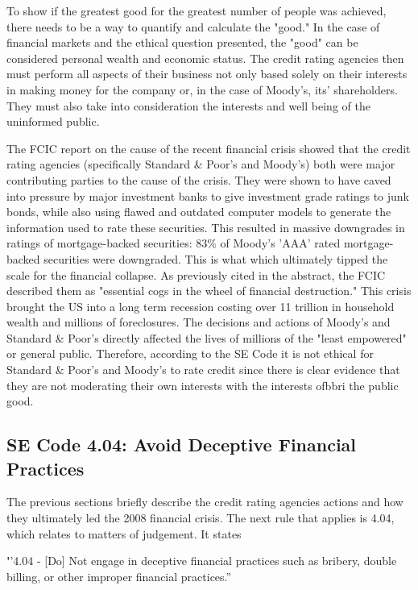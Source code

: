 \documentclass[11pt]{article}
\begin{document}
\begin{multicols}{2}
To show if the greatest good for the greatest number of people was achieved, there needs to be a way to quantify and calculate the "good." In the case of financial markets and the ethical question presented, the "good" can be considered personal wealth and economic status.  The credit rating agencies then must perform all aspects of their business not only based solely on their interests in making money for the company or, in the case of Moody's, its' shareholders.  They must also take into consideration the interests and well being of the uninformed public.

The FCIC report on the cause of the recent financial crisis showed that the credit rating agencies (specifically Standard \& Poor's and Moody's) both were major contributing parties to the cause of the crisis. \cite{govtReport, huffCreditCause}  They were shown to have caved into pressure by major investment banks to give investment grade ratings to junk bonds, while also using flawed and outdated computer models to generate the information used to rate these securities.  This resulted in massive downgrades in ratings of mortgage-backed securities: 83\% of Moody's 'AAA' rated mortgage-backed securities were downgraded. \cite[p.~xxv]{govtReport} This is what which ultimately tipped the scale for the financial collapse.  As previously cited in the abstract, the FCIC described them as "essential cogs in the wheel of financial destruction."  This crisis brought the US into a long term recession costing over 11 trillion in household wealth and millions of foreclosures.  The decisions and actions of Moody's and Standard \& Poor's directly affected the lives of millions of the "least empowered" or general public. Therefore, according to the SE Code it is not ethical for Standard \& Poor's and Moody's to rate credit since there is clear evidence that they are not moderating their own interests with the interests ofbbri the public good. 


\subsection{SE Code 4.04: Avoid Deceptive Financial Practices}

The previous sections briefly describe the credit rating agencies actions and how they ultimately led the 2008 financial crisis.  The next rule that applies is 4.04, which relates to matters of judgement.  It states

{\textbf''4.04 - [Do] Not engage in deceptive financial practices such as bribery, double billing, or other improper financial practices.''}


\end{multicols}
\end{document}
